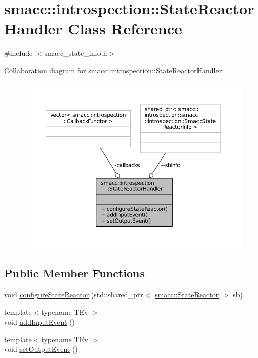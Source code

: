 \hypertarget{classsmacc_1_1introspection_1_1StateReactorHandler}{}\section{smacc\+:\+:introspection\+:\+:State\+Reactor\+Handler Class Reference}
\label{classsmacc_1_1introspection_1_1StateReactorHandler}


{\ttfamily \#include $<$smacc\+\_\+state\+\_\+info.\+h$>$}



Collaboration diagram for smacc\+:\+:introspection\+:\+:State\+Reactor\+Handler\+:
\nopagebreak
\begin{figure}[H]
\begin{center}
\leavevmode
\includegraphics[width=350pt]{classsmacc_1_1introspection_1_1StateReactorHandler__coll__graph}
\end{center}
\end{figure}
\subsection*{Public Member Functions}
\begin{DoxyCompactItemize}
\item 
void \hyperlink{classsmacc_1_1introspection_1_1StateReactorHandler_ae1a4c47a7ad70ce51a453540a040c0c8}{configure\+State\+Reactor} (std\+::shared\+\_\+ptr$<$ \hyperlink{classsmacc_1_1StateReactor}{smacc\+::\+State\+Reactor} $>$ sb)
\item 
{\footnotesize template$<$typename T\+Ev $>$ }\\void \hyperlink{classsmacc_1_1introspection_1_1StateReactorHandler_aef392b9521dc4484ef84082844cd3538}{add\+Input\+Event} ()
\item 
{\footnotesize template$<$typename T\+Ev $>$ }\\void \hyperlink{classsmacc_1_1introspection_1_1StateReactorHandler_a19af3db16879ed02048f08d9221d361a}{set\+Output\+Event} ()
\end{DoxyCompactItemize}

